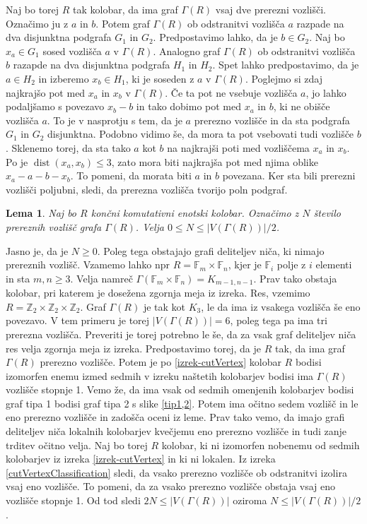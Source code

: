 \documentclass[a4paper, 12pt]{amsart}
\theoremstyle{definition} %
\theoremstyle{plain} %
\newtheorem{lema}[definicija]{Lema}
\newcommand{\Z}{\mathbb Z}
\newcommand{\F}{\mathbb F}
\DeclareMathOperator{\dist}{dist}
\begin{document}
Naj bo torej $R$ tak kolobar, da ima graf $\Gamma(R)$ vsaj dve prerezni vozlišči. Označimo ju z $a$ in $b$. Potem graf $\Gamma(R)$ ob odstranitvi vozlišča $a$ razpade na dva disjunktna podgrafa $G_1$ in $G_2$. Predpostavimo lahko, da je $b\in G_2$. Naj bo $x_a\in G_1$ sosed vozlišča $a$ v $\Gamma(R)$. Analogno graf $\Gamma(R)$ ob odstranitvi vozlišča $b$ razapde na dva disjunktna podgrafa $H_1$ in $H_2$. Spet lahko predpostavimo, da je $a\in H_2$ in izberemo $x_b\in H_1$, ki je soseden z $a$ v $\Gamma(R)$. Poglejmo si zdaj najkrajšo pot med $x_a$ in $x_b$ v $\Gamma(R)$. Če ta pot ne vsebuje vozlišča $a$, jo lahko podaljšamo s povezavo $x_b-b$ in tako dobimo pot med $x_a$ in $b$, ki ne obišče vozlišča $a$. To je v nasprotju s tem, da je $a$ prerezno vozlišče in da sta podgrafa $G_1$ in $G_2$ disjunktna. Podobno vidimo  še, da mora ta pot vsebovati tudi vozlišče $b$. Sklenemo torej, da sta tako $a$ kot $b$ na najkrajši poti med vozliščema $x_a$ in $x_b$. Po \cite{diploma} je $\dist(x_a,x_b)\le 3$, zato mora biti najkrajša pot med njima oblike $x_a  -  a - b - x_b$. To pomeni, da morata biti $a$ in $b$ povezana. Ker sta bili prerezni vozlišči poljubni, sledi, da prerezna vozlišča tvorijo poln podgraf.
\endproof

\begin{lema}
Naj bo $R$ končni komutativni enotski kolobar. Označimo z $N$ število prereznih vozlišč grafa $\Gamma(R)$. Velja $0\le N \le |V(\Gamma(R))|/2$.
\end{lema}

\proof
Jasno je, da je $N\ge 0$. Poleg tega obstajajo grafi deliteljev niča, ki nimajo prereznih vozlišč. Vzamemo lahko npr $R=\F_m \times \F_n$, kjer je $\F_i$ polje z $i$ elementi in sta $m,n \ge 3$. Velja namreč $\Gamma(\F_m \times \F_n) = K_{m-1,n-1}$. Prav tako obstaja kolobar, pri katerem je dosežena zgornja meja iz izreka. Res, vzemimo $R=\Z_2 \times \Z_2 \times \Z_2$. Graf $\Gamma(R)$ je tak kot $K_3$, le da ima iz vsakega vozlišča še eno povezavo. V tem primeru je torej $|V(\Gamma(R))| = 6$, poleg tega pa ima tri prerezna vozlišča. Preveriti je torej potrebno le še, da za vsak graf deliteljev niča res velja zgornja meja iz izreka. Predpostavimo torej, da je $R$ tak, da ima graf $\Gamma(R)$ prerezno vozlišče. Potem je po \ref{izrek-cutVertex} kolobar $R$ bodisi izomorfen enemu izmed sedmih v izreku naštetih kolobarjev bodisi ima $\Gamma(R)$ vozlišče stopnje 1. Vemo že, da ima vsak od sedmih omenjenih kolobarjev bodisi graf tipa 1 bodisi graf tipa 2 s slike \ref{tip1,2}. Potem ima očitno sedem vozlišč in le eno prerezno vozlišče in zadošča oceni iz leme. Prav tako vemo, da imajo grafi deliteljev niča lokalnih kolobarjev kvečjemu eno prerezno vozlišče in tudi zanje trditev očitno velja. Naj bo torej $R$ kolobar, ki ni izomorfen nobenemu od sedmih kolobarjev iz izreka \ref{izrek-cutVertex} in ki ni lokalen. Iz izreka \ref{cutVertexClassification} sledi, da vsako prerezno vozlišče ob odstranitvi izolira vsaj eno vozlišče. To pomeni, da za vsako prerezno vozlišče obstaja vsaj eno vozlišče stopnje 1. Od tod sledi $2N \le |V(\Gamma(R)) |$ oziroma $N \le |V(\Gamma(R))| /2$.
\endproof
\end{document}
